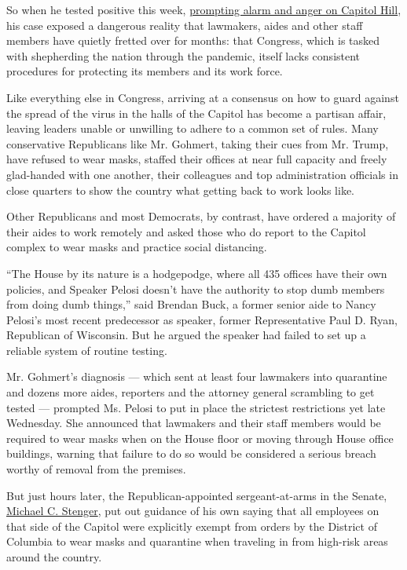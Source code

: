 So when he tested positive this week,
\href{https://www.nytimes.com/2020/07/29/us/politics/louie-gohmert-positive-coronavirus-mask.html}{prompting
alarm and anger on Capitol Hill}, his case exposed a dangerous reality
that lawmakers, aides and other staff members have quietly fretted over
for months: that Congress, which is tasked with shepherding the nation
through the pandemic, itself lacks consistent procedures for protecting
its members and its work force.

Like everything else in Congress, arriving at a consensus on how to
guard against the spread of the virus in the halls of the Capitol has
become a partisan affair, leaving leaders unable or unwilling to adhere
to a common set of rules. Many conservative Republicans like Mr.
Gohmert, taking their cues from Mr. Trump, have refused to wear masks,
staffed their offices at near full capacity and freely glad-handed with
one another, their colleagues and top administration officials in close
quarters to show the country what getting back to work looks like.

Other Republicans and most Democrats, by contrast, have ordered a
majority of their aides to work remotely and asked those who do report
to the Capitol complex to wear masks and practice social distancing.

``The House by its nature is a hodgepodge, where all 435 offices have
their own policies, and Speaker Pelosi doesn't have the authority to
stop dumb members from doing dumb things,'' said Brendan Buck, a former
senior aide to Nancy Pelosi's most recent predecessor as speaker, former
Representative Paul D. Ryan, Republican of Wisconsin. But he argued the
speaker had failed to set up a reliable system of routine testing.

Mr. Gohmert's diagnosis --- which sent at least four lawmakers into
quarantine and dozens more aides, reporters and the attorney general
scrambling to get tested --- prompted Ms. Pelosi to put in place the
strictest restrictions yet late Wednesday. She announced that lawmakers
and their staff members would be required to wear masks when on the
House floor or moving through House office buildings, warning that
failure to do so would be considered a serious breach worthy of removal
from the premises.

But just hours later, the Republican-appointed sergeant-at-arms in the
Senate,
\href{https://www.senate.gov/reference/common/person/stenger_michael_c.htm}{Michael
C. Stenger}, put out guidance of his own saying that all employees on
that side of the Capitol were explicitly exempt from orders by the
District of Columbia to wear masks and quarantine when traveling in from
high-risk areas around the country.

